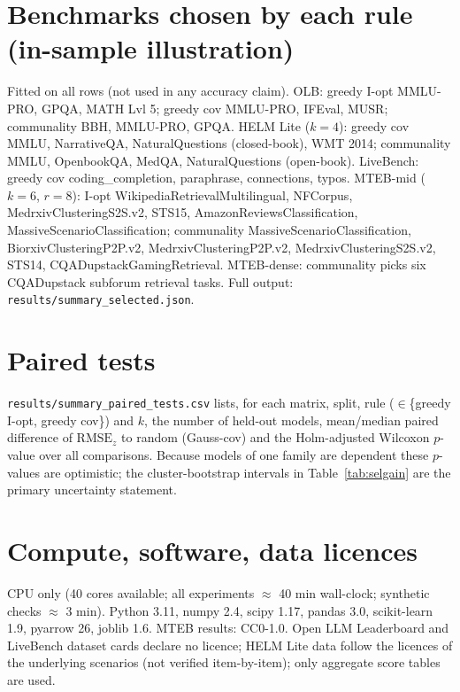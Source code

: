 \documentclass{article}
\newcommand{\rmse}{\mathrm{RMSE}_z}
\begin{document}
\begin{table}[h]
\caption{Stability across fold-assignment seeds and split type (MTEB-mid, median $\rmse$).}\label{tab:seeds}
\centering\small
\end{table}
\begin{table}[h]
\caption{Data-condition sweep, MTEB-mid, random split, median $\rmse$ (train-mean baseline $\approx0.74$ at full history; the baseline changes with the retained rows because standardisation is refit).}\label{tab:cond}
\centering\small
\end{table}

\section{Benchmarks chosen by each rule (in-sample illustration)}\label{app:selected}
Fitted on all rows (not used in any accuracy claim). OLB: greedy I-opt MMLU-PRO, GPQA, MATH Lvl 5; greedy cov MMLU-PRO, IFEval, MUSR; communality BBH, MMLU-PRO, GPQA. HELM Lite ($k=4$): greedy cov MMLU, NarrativeQA, NaturalQuestions (closed-book), WMT 2014; communality MMLU, OpenbookQA, MedQA, NaturalQuestions (open-book). LiveBench: greedy cov coding\_completion, paraphrase, connections, typos. MTEB-mid ($k=6$, $r=8$): I-opt WikipediaRetrievalMultilingual, NFCorpus, MedrxivClusteringS2S.v2, STS15, AmazonReviewsClassification, MassiveScenarioClassification; communality MassiveScenarioClassification, BiorxivClusteringP2P.v2, MedrxivClusteringP2P.v2, MedrxivClusteringS2S.v2, STS14, CQADupstackGamingRetrieval. MTEB-dense: communality picks six CQADupstack subforum retrieval tasks. Full output: \texttt{results/summary\_selected.json}.

\section{Paired tests}\label{app:tests}
\texttt{results/summary\_paired\_tests.csv} lists, for each matrix, split, rule ($\in$\{greedy I-opt, greedy cov\}) and $k$, the number of held-out models, mean/median paired difference of $\rmse$ to random (Gauss-cov) and the Holm-adjusted Wilcoxon $p$-value over all comparisons. Because models of one family are dependent these $p$-values are optimistic; the cluster-bootstrap intervals in Table~\ref{tab:selgain} are the primary uncertainty statement.

\section{Compute, software, data licences}
CPU only (40 cores available; all experiments $\approx$ 40 min wall-clock; synthetic checks $\approx$ 3 min). Python 3.11, numpy 2.4, scipy 1.17, pandas 3.0, scikit-learn 1.9, pyarrow 26, joblib 1.6. MTEB results: CC0-1.0. Open LLM Leaderboard and LiveBench dataset cards declare no licence; HELM Lite data follow the licences of the underlying scenarios (not verified item-by-item); only aggregate score tables are used.

\newpage

\end{document}
